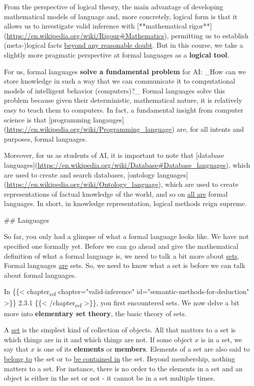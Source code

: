 \documentclass[11pt]{article}
\begin{document}
From the perspective of logical theory, the main advantage of developing
mathematical models of language and, more concretely, logical form is that it
allows us to investigate valid inference with [**mathematical
rigor**](\url{https://en.wikipedia.org/wiki/Rigour\#Mathematics}), permitting us to
establish (meta-)logical facts \uline{beyond any reasonable doubt}. But in this
course, we take a slightly more pragmatic perspective at formal languages as a
\textbf{\textbf{logical tool}}.

For us, formal languages \textbf{\textbf{solve a fundamental problem}} for AI: \_How can we
store knowledge in such a way that we can communicate it to computational models
of intelligent behavior (computers)?\_ Formal languages solve this problem
because given their deterministic, mathematical nature, it is relatively easy to
teach them to computers. In fact, a fundamental insight from computer science is
that [programming
langauges](\url{https://en.wikipedia.org/wiki/Programming\_language}) are, for all
intents and purposes, formal languages. 

Moreover, for us as students of AI, it is important to note that [database
languages](\url{https://en.wikipedia.org/wiki/Database\#Database\_languages}), which are
used to create and search databases, [ontology
languages](\url{https://en.wikipedia.org/wiki/Ontology\_language}), which are used to
create representations of factual knowledge of the world, and so on \uline{all are}
formal languages. In short, in knowledge representation, logical methods reign
supreme.

\#\# Languages

So far, you only had a glimpse of what a formal language looks like. We have not specified one formally yet. Before we can go ahead and give the mathematical definition of what a formal
language is, we need to talk a bit more about \uline{sets}. Formal languages \uline{are}
sets. So, we need to know what a set is before we can talk about formal
languages.

In \{\{< chapter\textsubscript{ref} chapter="valid-inference" id="semantic-methods-for-deduction" >\}\}
2.3.1 \{\{< /chapter\textsubscript{ref} >\}\}, you first encountered sets. We now delve a bit
more into \textbf{\textbf{elementary set theory}}, the basic theory of sets.

A \uline{set} is the simplest kind of collection of objects. All that matters to a set is which things are in it and which things are not. If some object \(x\) is in a set, we say that \(x\) is one of its \textbf{\textbf{elements}} or \textbf{\textbf{members}}. Elements of a set are also said to \uline{belong to} the set or to \uline{be contained in} the set. Beyond membership, nothing matters to a set. For instance, there is no order to the elements in a set and an object is either in the set or not - it cannot be in a set multiple times. 
\end{document}
